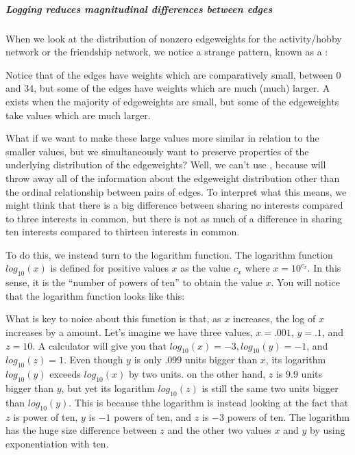 \documentclass[letterpaper,10pt,english]{jupyterBook}
\begin{document}
\subparagraph{Logging reduces magnitudinal differences between edges}
\label{\detokenize{representations/ch4/regularization:logging-reduces-magnitudinal-differences-between-edges}}
\sphinxAtStartPar
When we look at the distribution of non\sphinxhyphen{}zero edge\sphinxhyphen{}weights for the activity/hobby network or the friendship network, we notice a strange pattern, known as a :

\sphinxAtStartPar
Notice that  of the edges have weights which are comparatively small, between \(0\) and \(34\), but some of the edges have weights which are much (much) larger. A  exists when the majority of edge\sphinxhyphen{}weights are small, but some of the edge\sphinxhyphen{}weights take values which are much larger.

\sphinxAtStartPar
What if we want to make these large values more similar in relation to the smaller values, but we simultaneously want to preserve properties of the underlying distribution of the edge\sphinxhyphen{}weights? Well, we can’t use , because  will throw away all of the information about the edge\sphinxhyphen{}weight distribution other than the ordinal relationship between pairs of edges. To interpret what this means, we might think that there is a big difference between sharing no interests compared to three interests in common, but there is not as much of a difference in sharing ten interests compared to thirteen interests in common.

\sphinxAtStartPar
To do this, we instead turn to the logarithm function. The logarithm function \(log_{10}(x)\) is defined for positive values \(x\) as the value \(c_x\) where \(x = 10^{c_x}\). In this sense, it is the “number of powers of ten” to obtain the value \(x\). You will notice that the logarithm function looks like this:

\sphinxAtStartPar
What is key to noice about this function is that, as \(x\) increases, the log of \(x\) increases by a  amount. Let’s imagine we have three values, \(x = .001\), \(y = .1\), and \(z = 10\). A calculator will give you that \(log_{10}(x) = -3, log_{10}(y) = -1\), and \(log_{10}(z) = 1\). Even though \(y\) is only \(.099\) units bigger than \(x\), its logarithm \(log_{10}(y)\) exceeds \(log_{10}(x)\) by two units. on the other hand, \(z\) is \(9.9\) units bigger than \(y\), but yet its logarithm \(log_{10}(z)\) is still the same two units bigger than \(log_{10}(y)\). This is because thhe logarithm is instead looking at the fact that \(z\) is  power of ten, \(y\) is \(-1\) powers of ten, and \(z\) is \(-3\) powers of ten. The logarithm has  the huge size difference between \(z\) and the other two values \(x\) and \(y\) by using exponentiation with  ten.
\end{document}
